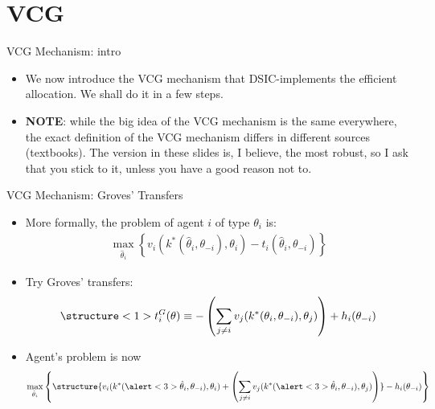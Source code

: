 \documentclass[english,10pt
,aspectratio=169
]{beamer}
\begin{document}
\section{VCG}

\begin{frame}{VCG Mechanism: intro}
\begin{itemize}
	\item We now introduce the VCG mechanism that DSIC-implements the efficient allocation. We shall do it in a few steps.
	\item \textbf{NOTE}: while the big idea of the VCG mechanism is the same everywhere, the \alert{exact definition} of the VCG mechanism \alert{differs} in different sources (textbooks). The version in these slides is, I believe, the most robust, so I ask that you stick to it, unless you have a good reason not to.
\end{itemize}
\end{frame}


\begin{frame}{VCG Mechanism: Groves' Transfers}
\begin{itemize}
	\item More formally, the problem of agent $i$ of type $\theta_i$ is:
	\vspace{-0.5em}\begin{align*}
	\max_{\hat{\theta}_i} \left\{  v_i(k^*(\hat{\theta}_i,\theta_{-i}),\theta_i) - t_i(\hat{\theta}_i,\theta_{-i}) \right\}
	\end{align*}\vspace{-1em}
	\item Try \alert<1>{Groves' transfers}:
	\vspace{-0.5em}\begin{align*}
	\structure<1>{ t^G_{i}(\theta) \equiv -\left(\sum_{j\neq i} v_{j}(k^*(\theta_i, \theta_{-i}), \theta_{j}) \right) + h_{i}(\theta_{-i}) }
	\end{align*}\vspace{-1em}
	\item Agent's problem is now
	\vspace{-0.5em}\begin{align*}
	\max_{\hat{\theta}_i} \left\{ \structure{v_i(k^*(\alert<3>{\hat{\theta}_i},\theta_{-i}),\theta_i) + \left( \sum_{j\neq i} v_{j}(k^*(\alert<3>{\hat{\theta}_i},\theta_{-i}), \theta_{j}) \right)} - h_{i}(\theta_{-i}) \right\}
	\end{align*}
\end{itemize}
\end{frame}
\end{document}
